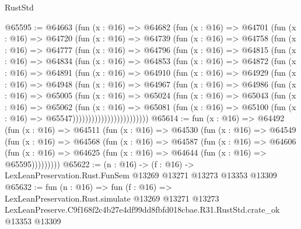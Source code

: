\begin{lexlean}{RustStd}
\begin{coremodule}
@65595 := @64663
    (fun (x : @16) =>
    @64682
      (fun (x : @16) =>
      @64701
        (fun (x : @16) =>
        @64720
          (fun (x : @16) =>
          @64739
            (fun (x : @16) =>
            @64758
              (fun (x : @16) =>
              @64777
                (fun (x : @16) =>
                @64796
                  (fun (x : @16) =>
                  @64815
                    (fun (x : @16) =>
                    @64834
                      (fun (x : @16) =>
                      @64853
                        (fun (x : @16) =>
                        @64872
                          (fun (x : @16) =>
                          @64891
                            (fun (x : @16) =>
                            @64910
                              (fun (x : @16) =>
                              @64929
                                (fun (x : @16) =>
                                @64948
                                  (fun (x : @16) =>
                                  @64967
                                    (fun (x : @16) =>
                                    @64986
                                      (fun (x : @16) =>
                                      @65005
                                        (fun (x : @16) =>
                                        @65024
                                          (fun (x : @16) =>
                                          @65043
                                            (fun (x : @16) =>
                                            @65062
                                              (fun (x : @16) =>
                                              @65081
                                                (fun (x : @16) =>
                                                @65100
                                                  (fun (x : @16) => @65547))))))))))))))))))))))))
@65614 := fun (x : @16) =>
  @64492
    (fun (x : @16) =>
    @64511
      (fun (x : @16) =>
      @64530
        (fun (x : @16) =>
        @64549
          (fun (x : @16) =>
          @64568
            (fun (x : @16) =>
            @64587
              (fun (x : @16) =>
              @64606
                (fun (x : @16) => @64625 (fun (x : @16) => @64644 (fun (x : @16) => @65595)))))))))
@65622 := (n : @16) ->
  (f : @16) -> LexLeanPreservation.Rust.FunSem @13269 @13271 @13273 @13353 @13309
@65632 := fun (n : @16) =>
  fun (f : @16) =>
  LexLeanPreservation.Rust.simulate
    @13269
    @13271
    @13273
    LexLeanPreserve.C9f168f2c4b27e4df99dd8fbfd018cbae.R31.RustStd.crate_ok
    @13353
    @13309
\end{coremodule}
\end{lexlean}
